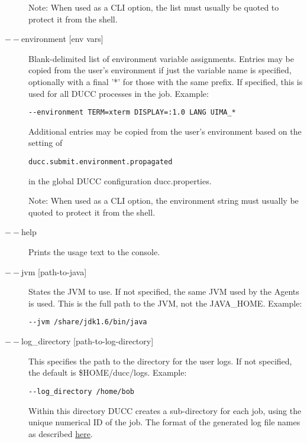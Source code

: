 \begin{description}
             Note: When used as a CLI option, the list must usually be
             quoted to protect it from the shell.

           \item[$--$environment {[env vars]}] Blank-delimited list of environment variable
             assignments. 
             Entries may be copied from the user's environment if just the variable name is
             specified, optionally with a final '*' for those with the same prefix.
             If specified, this is used for all DUCC processes in the job. Example:
\begin{verbatim}
--environment TERM=xterm DISPLAY=:1.0 LANG UIMA_*
\end{verbatim}
             
             Additional entries may be copied from the user's environment based on the setting of
\begin{verbatim}
ducc.submit.environment.propagated
\end{verbatim}
             in the global DUCC configuration ducc.properties.

             Note: When used as a CLI option, the environment string must usually be
             quoted to protect it from the shell.

           \item[$--$help ]

             Prints the usage text to the console. 

           \item[$--$jvm {[path-to-java]}  ]

             States the JVM to use. If not specified, the same JVM used by the Agents is used.  This is
             the full path to the JVM, not the JAVA\_HOME.
             Example: 
\begin{verbatim}
--jvm /share/jdk1.6/bin/java 
\end{verbatim}
             
           \item[$--$log\_directory {[path-to-log-directory]} ]

             This specifies the path to the directory for the user logs. If not specified, the default is
             \$HOME/ducc/logs. Example: 
             \begin{verbatim}
--log_directory /home/bob 
             \end{verbatim}
             
             Within this directory DUCC creates a sub-directory for each job, using the unique numerical 
             ID of the job. The format of the generated log file names as described
             \hyperref[chap:job-logs]{here}.
             

\end{description}
